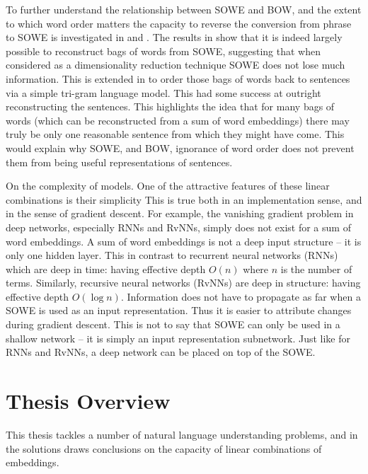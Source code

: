 \documentclass{book}
\begin{document}
To further understand the relationship between SOWE and BOW, and the extent to which word order matters the capacity to reverse the conversion from phrase to SOWE is investigated in  and .
The results in  show that it is indeed largely possible to reconstruct bags of words from SOWE, suggesting that when considered as a dimensionality reduction technique SOWE does not lose much information.
This is extended in  to order those bags of words back to sentences via a simple tri-gram language model.
This had some success at outright reconstructing the sentences.
This highlights the idea that for many  bags of words (which can be reconstructed from a sum of word embeddings) there may truly be only one reasonable sentence from which they might have come.
This would explain why SOWE, and BOW, ignorance of word order does not prevent them from being useful representations of sentences.






On the complexity of models.
One of the attractive features of these linear combinations is their simplicity
This is true both in an implementation sense, and in the sense of gradient descent.
For example, the vanishing gradient problem in deep networks, especially RNNs and RvNNs,
simply does not exist for a sum of word embeddings.
A sum of word embeddings is not a deep input structure -- it is only one hidden layer.
This in contrast to recurrent neural networks (RNNs) which are deep in time: having effective depth $O(n)$ where $n$ is the number of terms.
Similarly, recursive neural networks (RvNNs) are deep in structure: having effective depth $O(\log n)$.
Information does not have to propagate as far when a SOWE is used as an input representation.
Thus it is easier to attribute changes during gradient descent.
This is not to say that SOWE can only be used in a shallow network -- it is simply an input representation subnetwork.
Just like for RNNs and RvNNs, a deep network can be placed on top of the SOWE.




\section{Thesis Overview}
This thesis tackles a number of natural language understanding problems, and in the solutions draws conclusions on the capacity of linear combinations of embeddings.
\end{document}
